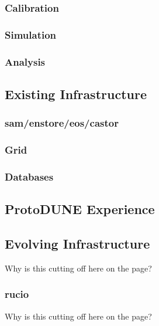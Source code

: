 \subsubsection{Calibration}
\label{ch:exec-comp-mod-use-calib}


\subsubsection{Simulation}
\label{ch:exec-comp-mod-use-sim}


\subsubsection{Analysis}
\label{ch:exec-comp-mod-use-anls}


\subsection{Existing Infrastructure}	
\label{ch:exec-comp-mod-infr}


\subsubsection{sam/enstore/eos/castor}
\label{ch:exec-comp-mod-infr-stor}


\subsubsection{Grid}
\label{ch:exec-comp-mod-infr-gr}


\subsubsection{Databases}
\label{ch:exec-comp-mod-infr-db}


\subsection{ProtoDUNE Experience}	
\label{ch:exec-comp-mod-pdune}


\subsection{Evolving Infrastructure}	
\label{ch:exec-comp-mod-evlv}
Why is this cutting off here on the page?

\subsubsection{rucio}
\label{ch:exec-comp-mod-evlv-ruc}
Why is this cutting off here on the page?

